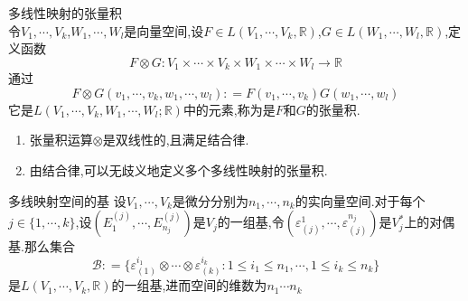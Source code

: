 \documentclass[../../几何与拓扑.tex]{subfiles}
\begin{document}
\begin{example}{多线性映射的张量积}
 \\ 令$V_{1},{\cdots},V_{k}$,$W_{1},{\cdots},W_{l}$是向量空间,设$F \in L\left( V_{1},{\cdots},V_{k},\mathbb{R} \right)$,$G \in L\left( W_{1},{\cdots},W_{l},\mathbb{R} \right)$,定义函数 $$ F\otimes G: V_{1}\times{\cdots}\times V_{k}\times W_{1}\times{\cdots}\times W_{l}\to \mathbb{R} $$通过 $$ F\otimes G\left( v_{1},{\cdots},v_{k},w_{1},{\cdots},w_{l} \right) : = F\left( v_{1},{\cdots},v_{k} \right) G\left( w_{1},{\cdots},w_{l} \right)  $$它是$L\left( V_{1},{\cdots},V_{k},W_{1},{\cdots},W_{l};\mathbb{R} \right)$中的元素,称为是$F$和$G$的张量积.
\end{example}
\begin{remark}
    \begin{enumerate}
        \item 张量积运算$\otimes$是双线性的,且满足结合律.
        \item 由结合律,可以无歧义地定义多个多线性映射的张量积.
    \end{enumerate}
    
\end{remark}

\begin{proposition}{多线映射空间的基}
    设$V_{1},{\cdots},V_{k}$是微分分别为$n_{1},{\cdots},n_{k}$的实向量空间.对于每个$j\in \{ 1,{\cdots},k \}$,设$\left( E_{1}^{\left( j \right)},{\cdots},E_{n_{j}}^{\left( j \right)} \right)$是$V_{j}$的一组基,令$\left( \varepsilon ^{1}_{\left( j \right)},{\cdots}, \varepsilon _{\left( j \right)}^{n_{j}} \right)$是$V_{j}^{*}$上的对偶基.那么集合 $$ \mathscr{B}: = \{ \varepsilon ^{i_{1}}_{\left( 1 \right) }\otimes {\cdots}\otimes \varepsilon ^{i_{k}}_{\left( k \right) }:1\leqslant i_{1}\leqslant n_{1},{\cdots},1\leqslant i_{k}\leqslant n_{k} \} $$是$L\left( V_{1},{\cdots},V_{k},\mathbb{R} \right)$的一组基,进而空间的维数为$n_{1}{\cdots}n_{k}$
\end{proposition}
\end{document}
